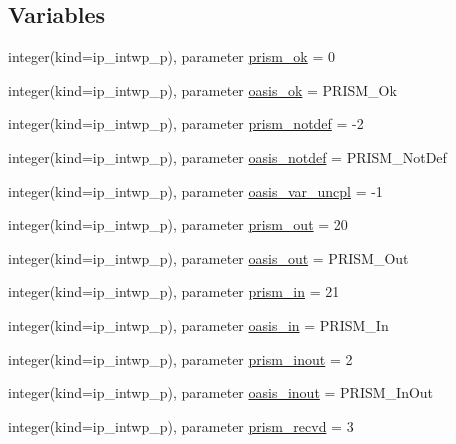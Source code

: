 \subsection*{Variables}
\begin{DoxyCompactItemize}
\item 
integer(kind=ip\+\_\+intwp\+\_\+p), parameter \hyperlink{namespacemod__oasis__parameters_aa7cbeb1a099f571702827ace878cdc64}{prism\+\_\+ok} = 0
\item 
integer(kind=ip\+\_\+intwp\+\_\+p), parameter \hyperlink{namespacemod__oasis__parameters_a3ea125963822918ce37fd3cfd9658c9f}{oasis\+\_\+ok} = P\+R\+I\+S\+M\+\_\+\+Ok
\item 
integer(kind=ip\+\_\+intwp\+\_\+p), parameter \hyperlink{namespacemod__oasis__parameters_aa388f517f0a947f770637d617bdda79b}{prism\+\_\+notdef} = -\/2
\item 
integer(kind=ip\+\_\+intwp\+\_\+p), parameter \hyperlink{namespacemod__oasis__parameters_acbe396fd3b5e7b00dd66425f0acb546d}{oasis\+\_\+notdef} = P\+R\+I\+S\+M\+\_\+\+Not\+Def
\item 
integer(kind=ip\+\_\+intwp\+\_\+p), parameter \hyperlink{namespacemod__oasis__parameters_ac906e1466e6cdc300a0b582af6619ca5}{oasis\+\_\+var\+\_\+uncpl} = -\/1
\item 
integer(kind=ip\+\_\+intwp\+\_\+p), parameter \hyperlink{namespacemod__oasis__parameters_a58d4e90d13e758e6a6dfab01e6a1415e}{prism\+\_\+out} = 20
\item 
integer(kind=ip\+\_\+intwp\+\_\+p), parameter \hyperlink{namespacemod__oasis__parameters_a76a150fa8ef6ed0b35183e627d757439}{oasis\+\_\+out} = P\+R\+I\+S\+M\+\_\+\+Out
\item 
integer(kind=ip\+\_\+intwp\+\_\+p), parameter \hyperlink{namespacemod__oasis__parameters_a9cd491b86da0ba4612f2de5a9ef52e7c}{prism\+\_\+in} = 21
\item 
integer(kind=ip\+\_\+intwp\+\_\+p), parameter \hyperlink{namespacemod__oasis__parameters_a16809ad581bb609aa5b0661927478653}{oasis\+\_\+in} = P\+R\+I\+S\+M\+\_\+\+In
\item 
integer(kind=ip\+\_\+intwp\+\_\+p), parameter \hyperlink{namespacemod__oasis__parameters_ae8105d0074bcd93e7da5c40331d2b9fe}{prism\+\_\+inout} = 2
\item 
integer(kind=ip\+\_\+intwp\+\_\+p), parameter \hyperlink{namespacemod__oasis__parameters_adc22f0871027f573ac705ca4593519f0}{oasis\+\_\+inout} = P\+R\+I\+S\+M\+\_\+\+In\+Out
\item 
integer(kind=ip\+\_\+intwp\+\_\+p), parameter \hyperlink{namespacemod__oasis__parameters_aa0bc3b208a1f962e5ec08916b36cae2d}{prism\+\_\+recvd} = 3

\end{DoxyCompactItemize}
